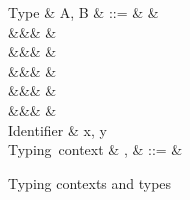 \begin{figure}[H]
\begin{syntaxfig}
\mbox{Type}
&
A, B
&
::=
&
\tyBool
&
\\
&&&
\tyInt
&
\\
&&&
&
\\
&&&
&
\\
&&&
&
\\
&&&
&
\\[2mm]
\mbox{Identifier}
&
x, y
\\[2mm]
\mbox{Typing context}
&
\Gamma, \Delta
&
::=
&
\end{syntaxfig}
\caption{Typing contexts and types}
\label{fig:core-syntax-type}
\end{figure}
